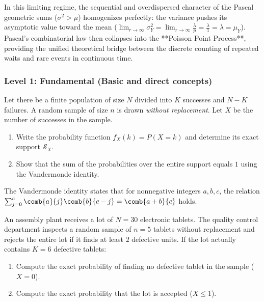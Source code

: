 \begin{solucion}
\begin{enumerate}
		In this limiting regime, the sequential and overdispersed character of the Pascal geometric sums ($\sigma^2 > \mu$) homogenizes perfectly: the variance pushes its asymptotic value toward the mean ($\lim_{r \to \infty} \sigma_Y^2 = \lim_{r \to \infty} \frac{\lambda}{p} = \frac{\lambda}{1} = \lambda = \mu_Y$). Pascal's combinatorial law then collapses into the **Poisson Point Process**, providing the unified theoretical bridge between the discrete counting of repeated waits and rare events in continuous time.
	\end{enumerate}
\end{solucion}


\subsubsection*{Level 1: Fundamental (Basic and direct concepts)}

\begin{problema}
	\label{prob:3.6.1}
	Let there be a finite population of size $N$ divided into $K$ successes and $N-K$ failures. A random sample of size $n$ is drawn \emph{without replacement}. Let $X$ be the number of successes in the sample.
	\begin{enumerate}
		\item Write the probability function $f_X(k) = P(X = k)$ and determine its exact support $\mathcal{S}_X$.
		\item Show that the sum of the probabilities over the entire support equals $1$ using the Vandermonde identity.
	\end{enumerate}
\end{problema}

\begin{sugerencia}
	The Vandermonde identity states that for nonnegative integers $a, b, c$, the relation $\sum_{j=0}^{c} \comb{a}{j} \comb{b}{c-j} = \comb{a+b}{c}$ holds.
\end{sugerencia}

\begin{problema}
	\label{prob:3.6.2}
	An assembly plant receives a lot of $N=30$ electronic tablets. The quality control department inspects a random sample of $n=5$ tablets without replacement and rejects the entire lot if it finds at least $2$ defective units. If the lot actually contains $K=6$ defective tablets:
	\begin{enumerate}
		\item Compute the exact probability of finding no defective tablet in the sample ($X = 0$).
		\item Compute the exact probability that the lot is accepted ($X \le 1$).
	\end{enumerate}
\end{problema}

